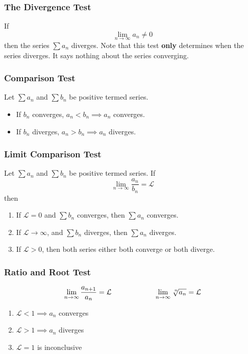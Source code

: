 \documentclass{article}
\begin{document}
\subsubsection{The Divergence Test}
If
\[
\lim_{n\to\infty}a_{n}\neq 0
\]
then the series $\sum a_{n}$ diverges.
Note that this test \textbf{only} determines when the series diverges.
It says nothing about the series converging.

\subsubsection{Comparison Test}
Let $\sum a_{n}$ and $\sum b_{n}$ be positive termed series.
\begin{itemize}
\item If $b_{n}$ converges, $a_{n} < b_{n} \implies a_{n}$ converges.
\item If $b_{n}$ diverges, $a_{n} > b_{n} \implies a_{n}$ diverges.
\end{itemize}

\subsubsection{Limit Comparison Test}
Let $\sum a_{n}$ and $\sum b_{n}$ be positive termed series.
If
\[
\lim_{n\to\infty}\frac{a_{n}}{b_{n}} = \mathcal{L}
\]
then
\begin{enumerate}
\item If $\mathcal{L} = 0$ and $\sum b_{n}$ converges, then $\sum a_{n}$ converges.
\item If $\mathcal{L} \to \infty$, and $\sum b_{n}$ diverges, then $\sum a_{n}$ diverges.
\item If $\mathcal{L} > 0$, then both series either both converge or both diverge.
\end{enumerate}

\subsubsection{Ratio and Root Test}
\[
\lim_{n\to\infty}\frac{a_{n+1}}{a_{n}} = \mathcal{L}\qquad\qquad\qquad
\lim_{n\to\infty}\sqrt[\leftroot{-2}\uproot{2}n]{a_{n}} = \mathcal{L}
\]
\begin{enumerate}
\item $\mathcal{L} < 1 \implies a_{n}$ converges
\item $\mathcal{L} > 1 \implies a_{n}$ diverges
\item $\mathcal{L} = 1$ is inconclusive
\end{enumerate}
\end{document}
